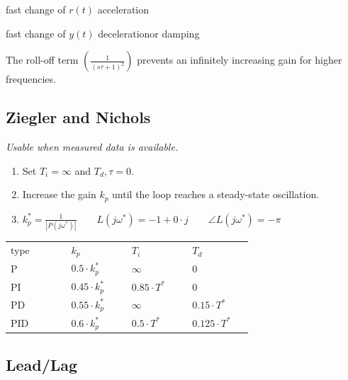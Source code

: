 \documentclass[10pt,a4paper]{scrartcl}
\begin{document}
\begin{multicols*}{3}
\begin{itemize}
	\finn	
	
	fast change of $r(t)$ \dahe \glqq acceleration\grqq
	
	fast change of $y(t)$ \dahe \glqq deceleration\grqq or damping
	\end{itemize}
	
	
	
	The roll-off term $\left(\frac{1}{(s\tau+1)^2}\right)$ prevents an infinitely increasing gain for higher frequencies.
	
	
	
	\subsection{Ziegler and Nichols}
	
	\emph{Usable when measured data is available.}
	
	\begin{enumerate}
	\compaq
	\item
	Set $T_i=\infty$ and $T_d, \tau = 0$.
	\item	
	Increase the gain $k_p$ until the loop reaches a steady-state oscillation.
	\item
	\dahe $k_p^*=\frac{1}{|P(j\omega^*)|}\qquad L(j\omega^*)=-1+0\cdot j \qquad \angle L(j\omega^*)=-\pi$
	\end{enumerate}
	
	\begin{center}
	\begin{tabular}{|p{0.2\linewidth}p{0.2\linewidth}p{0.2\linewidth}p{0.2\linewidth}|}
	\hline
	type & $k_p$ & $T_i$ & $T_d$\\
	P	&	$0.5\cdot k_p^*$ & $\infty$ & $0$\\
	PI	&	$0.45\cdot k_p^*$ & $0.85\cdot T^*$ & 0\\
	PD 	&	$0.55\cdot k_p^*$ & $\infty$	&	$0.15\cdot T^*$\\
	PID	&	$0.6\cdot k_p^*$ & $0.5\cdot T^*$& $0.125\cdot T^*$\\
	\hline
	\end{tabular}
	\end{center}
	
	
	
	\subsection{Lead/Lag}
	

\end{multicols*}
\end{document}
